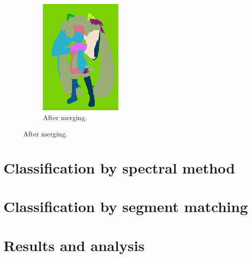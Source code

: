 \documentclass{beamer}
\begin{document}
\begin{frame}
\begin{figure}[htb!]
\begin{subfigure}{0.3\textwidth}
\includegraphics[width=\textwidth]{../images/miku_seg_fused.png}
\caption{After merging.}
\end{subfigure}
\end{figure}
\end{frame}

\section{Classification by spectral method}

\section{Classification by segment matching}

\section{Results and analysis}
\end{document}
